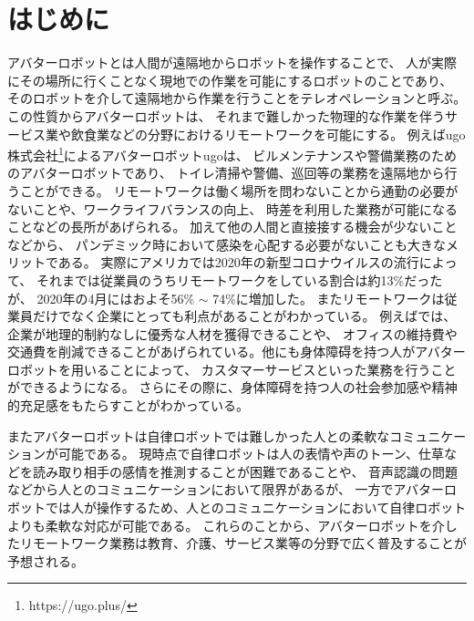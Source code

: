 \documentclass{kuisthesis}
\begin{document}
\tableofcontents



\section{はじめに} %
\label{sec: はじめに} %
アバターロボットとは人間が遠隔地からロボットを操作することで、
人が実際にその場所に行くことなく現地での作業を可能にするロボットのことであり、
そのロボットを介して遠隔地から作業を行うことをテレオペレーションと呼ぶ。
この性質からアバターロボットは、
それまで難しかった物理的な作業を伴うサービス業や飲食業などの分野におけるリモートワークを可能にする。
例えばugo株式会社\footnote{https://ugo.plus/}によるアバターロボットugoは、
ビルメンテナンスや警備業務のためのアバターロボットであり、
トイレ清掃や警備、巡回等の業務を遠隔地から行うことができる。
リモートワークは働く場所を問わないことから通勤の必要がないことや、ワークライフバランスの向上、
時差を利用した業務が可能になることなどの長所があげられる。
加えて他の人間と直接接する機会が少ないことなどから、
パンデミック時において感染を心配する必要がないことも大きなメリットである。
実際にアメリカでは2020年の新型コロナウイルスの流行によって、
それまでは従業員のうちリモートワークをしている割合は約13\%だったが、
2020年の4月にはおよそ56\% $\sim$ 74\%に増加した\cite{ozimek2020future}。
またリモートワークは従業員だけでなく企業にとっても利点があることがわかっている。
例えば\cite{FERREIRA202170}では、企業が地理的制約なしに優秀な人材を獲得できることや、
オフィスの維持費や交通費を削減できることがあげられている。他にも身体障碍を持つ人がアバターロボットを用いることによって、
カスタマーサービスといった業務を行うことができるようになる。
さらにその際に、身体障碍を持つ人の社会参加感や精神的充足感をもたらすことがわかっている\cite{takeuchi2020avatar}。

またアバターロボットは自律ロボットでは難しかった人との柔軟なコミュニケーションが可能である。
現時点で自律ロボットは人の表情や声のトーン、仕草などを読み取り相手の感情を推測することが困難であることや、
音声認識の問題などから人とのコミュニケーションにおいて限界があるが、
一方でアバターロボットでは人が操作するため、人とのコミュニケーションにおいて自律ロボットよりも柔軟な対応が可能である。
これらのことから、アバターロボットを介したリモートワーク業務は教育、介護、サービス業等の分野で広く普及することが予想される。
\end{document}
